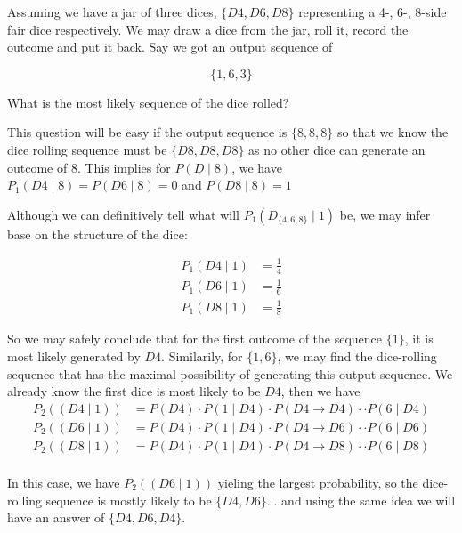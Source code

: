 \documentclass[11pt]{article}
\begin{document}
\noindent Assuming we have a jar of three dices, $\{D4, D6, D8 \}$ representing a 4-, 6-, 8-side fair dice respectively. We may draw a dice from the jar, roll it, record the outcome and put it back. Say we got an output sequence of

\begin{equation*}
    \{1, 6, 3\}
\end{equation*}

What is the most likely sequence of the dice rolled?\newline


\noindent This question will be easy if the output sequence is $\{ 8, 8, 8\}$ so that we know the dice rolling sequence must be $\{D8, D8, D8 \}$ as no other dice can generate an outcome of $8$. This implies for $P(D \mid 8)$, we have $P_1(D4 \mid 8) = P(D6 \mid 8) = 0$ and $P(D8 \mid 8) = 1$

Although we can definitively tell what will $P_1(D_{\{4, 6, 8\}} \mid 1)$ be, we may infer base on the structure of the dice:

\begin{align*}
    P_1(D4 \mid 1) &= \frac{1}{4} \\
    P_1(D6 \mid 1) &= \frac{1}{6} \\
    P_1(D8 \mid 1) &= \frac{1}{8}
\end{align*}

So we may safely conclude that for the first outcome of the sequence $\{1\}$, it is most likely generated by $D4$. Similarily, for $\{1, 6\}$, we may find the dice-rolling sequence that has the maximal possibility of generating this output sequence. We already know the first dice is most likely to be $D4$, then we have
\begin{align*}
    P_2((D4 \mid 1)) &= P(D4) \cdot P(1 \mid D4) \cdot P(D4 \to D4) \cdot  \cdot P(6 \mid D4) \\
    P_2((D6 \mid 1)) &= P(D4) \cdot P(1 \mid D4) \cdot P(D4 \to D6) \cdot  \cdot P(6 \mid D6) \\
    P_2((D8 \mid 1)) &= P(D4) \cdot P(1 \mid D4) \cdot P(D4 \to D8) \cdot  \cdot P(6 \mid D8) \\
\end{align*}

In this case, we have $P_2((D6 \mid 1))$ yieling the largest probability, so the dice-rolling sequence is mostly likely to be $\{D4, D6\}$... and using the same idea we will have an answer of $\{D4, D6, D4\}$.\newline
\end{document}
